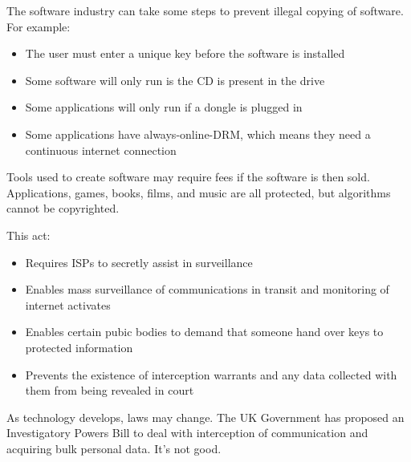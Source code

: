 \documentclass[../main.tex]{subfile}
\begin{document}
The software industry can take some steps to prevent illegal copying of software. For example: \begin{itemize}
	\item The user must enter a unique key before the software is installed
	\item Some software will only run is the CD is present in the drive
	\item Some applications will only run if a dongle is plugged in
	\item Some applications have always-online-DRM, which means they need a continuous internet connection
\end{itemize}

Tools used to create software may require fees if the software is then sold. Applications, games, books, films, and music are all protected, but algorithms cannot be copyrighted.


This act: \begin{itemize}
	\item Requires ISPs to secretly assist in surveillance
	\item Enables mass surveillance of communications in transit and monitoring of internet activates
	\item Enables certain pubic bodies to demand that someone hand over keys to protected information
	\item Prevents the existence of interception warrants and any data collected with them from being revealed in court
\end{itemize}

As technology develops, laws may change. The UK Government has proposed an Investigatory Powers Bill to deal with interception of communication and acquiring bulk personal data. It's not good.
\end{document}
